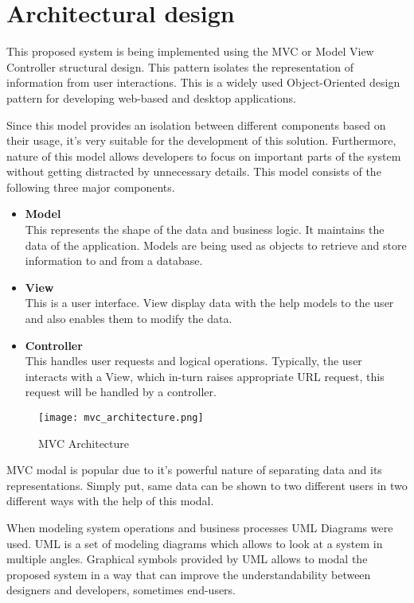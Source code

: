 \documentclass[12pt]{report}
\begin{document}
\section{Architectural design}
This proposed system is being implemented using the MVC  or Model View Controller structural design. This pattern isolates the representation of information from user interactions. This is a widely used Object-Oriented design pattern for developing web-based and desktop applications.

Since this model provides an isolation between different components based on their  usage, it’s very suitable for the development of this solution. Furthermore, nature of this model allows developers to focus on important parts of the system without getting distracted by unnecessary details. This model consists of the following three major components.

\begin{itemize}
	\item {\bf{Model}}\\
	      This represents the shape of the data and business logic. It maintains the data of the application. Models are being used as objects to retrieve and store information to and from a database.

	\item {\bf{View}}\\
	      This is a user interface. View display data with the help models to the user and also enables them to modify the data.

	\item {\bf{Controller}}\\
	      This handles user requests and logical operations. Typically, the user interacts with a View, which in-turn raises appropriate URL request, this request will be handled by a controller.
\end{itemize}

\begin{figure}[H]
	\centering
	\texttt{[image: mvc\_architecture.png]}
	\caption{MVC Architecture}
\end{figure}

MVC modal is popular due to it’s powerful nature of separating data and its representations. Simply put, same data can be shown to two different users in two different ways with the help of this modal.

When modeling system operations and business processes UML Diagrams were used. UML is a set of modeling diagrams which allows to look at a system in multiple angles. Graphical symbols provided by UML allows to modal the proposed system in a way that can improve the understandability between designers and developers, sometimes end-users.
\end{document}
